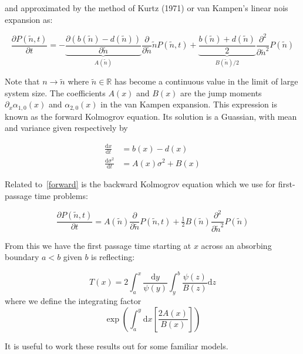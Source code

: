 \documentclass[letterpaper,10pt]{article}
\newcommand{\ud}{\mathrm{d}}
\begin{document}
and approximated by the method of Kurtz (1971) or van Kampen's linear nois expansion as:

\begin{equation}
\frac{\partial P(\tilde n,t)}{\partial t} = - \underbrace{\frac{\partial \left( b(\tilde n)-d(\tilde n) \right)}{\partial \tilde n}}_{A(\tilde n) } \frac{\partial}{\partial \tilde n} \tilde n  P(\tilde n,t)+ \underbrace{\frac{b(\tilde n)+ d(\tilde n)}{2} }_{B(\tilde n)/2} \frac{\partial^2}{\partial \tilde n^2} P(\tilde n)
\label{forward}
\end{equation}

Note that $n\to \tilde n$ where $\tilde n \in \mathbb{R}$ has become a continuous value in the limit of large system size.  The coefficients $A(x)$ and $B(x)$ are the jump moments $\partial_x \alpha_{1,0}(x)$ and $\alpha_{2,0}(x)$ in the van Kampen expansion.  This expression is known as the forward Kolmogrov equation.  Its solution is a Guassian, with mean and variance given respectively by

\begin{align}
\frac{\ud x }{\ud t} &= b(x)-d(x) \nonumber \\
\frac{\ud \sigma^2}{\ud t} &= A(x) \sigma^2 + B(x)
\label{moments}
\end{align}



Related to~\eqref{forward} is the backward Kolmogrov equation which we use for first-passage time problems:

\begin{equation}
\frac{\partial P(\tilde n,t)}{\partial t} = A(\tilde n) \frac{\partial}{\partial \tilde n}  P(\tilde n,t)+ \tfrac{1}{2}  B(\tilde n)\frac{\partial^2}{\partial \tilde n^2} P(\tilde n)
\label{backward}
\end{equation}

From this we have the first passage time starting at $x$ across an absorbing boundary $a < b$ given $b$ is reflecting:

\begin{equation}
T(x) = 2 \int^x_a \frac{\ud y}{\psi(y)} \int_y^b \frac{\psi(z) }{B(z)} \ud z
\label{firstpassage}
\end{equation}
where we define the integrating factor 
\begin{equation}
\exp\left( \int_a^y \ud x \left[ \frac{2 A(x)}{B(x)} \right] \right)
\label{integrating factor}
\end{equation}

It is useful to work these results out for some familiar models.  
\end{document}
